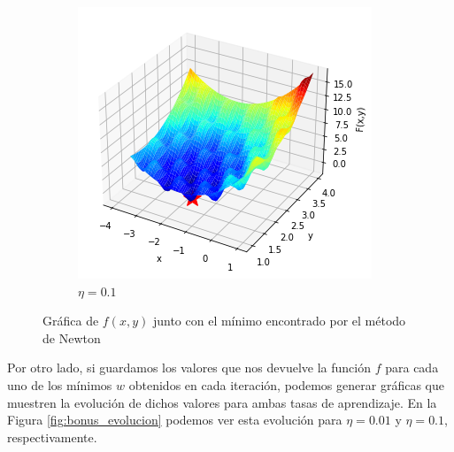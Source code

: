 \documentclass[10pt,a4paper]{article}
\begin{document}
\begin{figure}[h]
\begin{subfigure}{0.5\textwidth}
		\includegraphics[width=\textwidth]{bonus_grafica_eta0.1}
		\caption{$\eta = 0.1$}
	\end{subfigure}
	\caption{Gráfica de $f(x,y)$ junto con el mínimo encontrado por el método de Newton}
	\label{fig:bonus_graficas}
\end{figure}

Por otro lado, si guardamos los valores que nos devuelve la función $f$ para cada uno de los mínimos $w$ obtenidos en cada iteración, podemos generar gráficas que muestren la evolución de dichos valores para ambas tasas de aprendizaje. En la Figura \ref{fig:bonus_evolucion} podemos ver esta evolución para $\eta = 0.01$ y $\eta = 0.1$, respectivamente.
\end{document}

